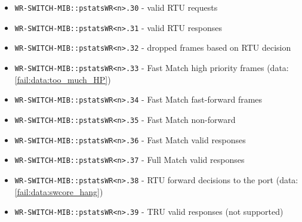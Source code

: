 \begin{itemize}[leftmargin=0pt]
	\item [] \texttt{WR-SWITCH-MIB::pstatsWR<n>.30} - valid RTU requests
	\item [] \texttt{WR-SWITCH-MIB::pstatsWR<n>.31} - valid RTU responses
	\item [] \texttt{WR-SWITCH-MIB::pstatsWR<n>.32} - dropped frames based on RTU
		decision
	\item [] \texttt{WR-SWITCH-MIB::pstatsWR<n>.33} - Fast Match high priority
		frames (data: \ref{fail:data:too_much_HP})
	\item [] \texttt{WR-SWITCH-MIB::pstatsWR<n>.34} - Fast Match fast-forward
		frames
	\item [] \texttt{WR-SWITCH-MIB::pstatsWR<n>.35} - Fast Match non-forward
	\item [] \texttt{WR-SWITCH-MIB::pstatsWR<n>.36} - Fast Match valid responses
	\item [] \texttt{WR-SWITCH-MIB::pstatsWR<n>.37} - Full Match valid responses
	\item [] \texttt{WR-SWITCH-MIB::pstatsWR<n>.38} - RTU forward decisions to the
		port (data: \ref{fail:data:swcore_hang})
	\item [] \texttt{WR-SWITCH-MIB::pstatsWR<n>.39} - TRU valid responses (not
		supported)
\end{itemize}

